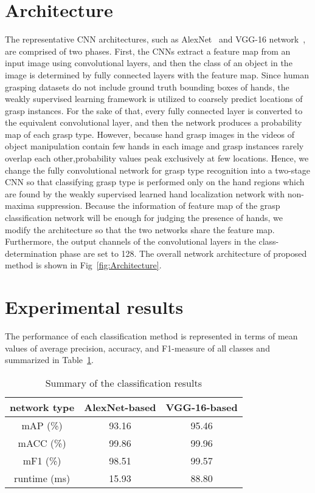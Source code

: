 \documentclass[10pt,twocolumn,letterpaper]{article}
\begin{document}
\section{Architecture}
The representative CNN architectures, such as AlexNet~\cite{Krizhevsky2012ImageNet} and VGG-16 network~\cite{Simonyan2014Very}, are comprised of two phases. First, the CNNs extract a feature map from an input image using convolutional layers, and then the class of an object in the image is determined by fully connected layers with the feature map. Since human grasping datasets do not include ground truth bounding boxes of hands, the weakly supervised learning framework is utilized to coarsely predict locations of grasp instances. For the sake of that, every fully connected layer is converted to the equivalent convolutional layer, and then the network produces a probability map of each grasp type. However, because hand grasp images in the videos of object manipulation contain few hands in each image and grasp instances rarely overlap each other,probability values peak exclusively at few locations. Hence, we change the fully convolutional network for grasp type recognition into a two-stage CNN so that classifying grasp type is performed only on the hand regions which are found by the weakly supervised learned hand localization network
with non-maxima suppression. Because the information of feature map of the grasp classification
network will be enough for judging the presence of hands, we modify the architecture so that the two networks
share the feature map. Furthermore, the output channels of the convolutional layers in the class-determination
phase are set to 128. The overall network architecture of proposed method is shown in Fig~\ref{fig:Architecture}.
\section{Experimental results} 
The performance of each classification method is represented in terms of mean values of average precision, accuracy, and F1-measure of all classes and summarized in Table~\ref{Tab:Experiment}.

\begin{table}
\begin{center}
\caption{Summary of the classification results}
\begin{tabular}{ccc}
\toprule
network type & AlexNet-based & VGG-16-based \\
\midrule
mAP (\%) & 93.16 & 95.46 \\
mACC (\%) & 99.86 & 99.96 \\
mF1 (\%) & 98.51 & 99.57 \\
runtime (ms) & 15.93 & 88.80 \\
\bottomrule
\end{tabular}
\label{Tab:Experiment}
\end{center}
\end{table}
\end{document}
